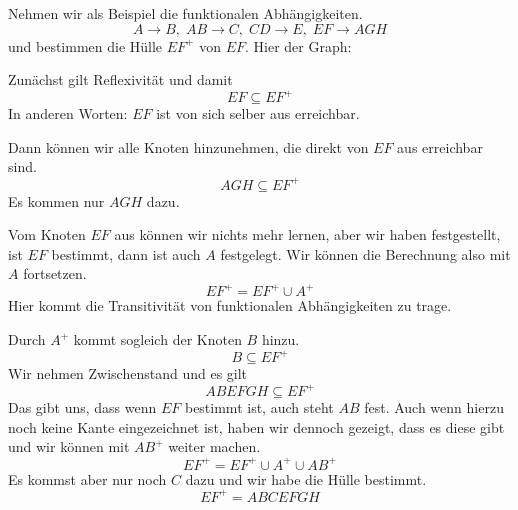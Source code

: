 \documentclass[a4paper, ngerman]{article}
\begin{document}
Nehmen wir als Beispiel
die funktionalen Abhängigkeiten.
$$
    A  \to B,\;
    AB \to C,\;
    CD \to E,\;
    EF \to AGH
$$
und bestimmen die Hülle $EF^+$ von $EF$.
Hier der Graph:
\begin{center}
\end{center}
Zunächst gilt Reflexivität und damit
$$
    EF \subseteq EF^+
$$
In anderen Worten: $EF$ ist von sich selber aus erreichbar.

Dann können wir alle Knoten hinzunehmen,
die direkt von $EF$ aus erreichbar sind.
$$
    AGH \subseteq EF^+  
$$
Es kommen nur $AGH$ dazu.

Vom Knoten $EF$ aus können wir nichts mehr lernen,
aber wir haben festgestellt, ist $EF$ bestimmt,
dann ist auch $A$ festgelegt.
Wir können die Berechnung also mit $A$ fortsetzen.
$$
    EF^+ = EF^+ \cup A^+
$$
Hier kommt die Transitivität
von funktionalen Abhängigkeiten zu trage.

Durch $A^+$ kommt sogleich der Knoten $B$ hinzu.
$$
    B \subseteq EF^+
$$
Wir nehmen Zwischenstand und es gilt
$$
    ABEFGH \subseteq EF^+
$$
Das gibt uns, dass wenn $EF$ bestimmt ist,
auch steht $AB$ fest.
Auch wenn hierzu noch keine Kante eingezeichnet ist,
haben wir dennoch gezeigt, dass es diese gibt
und wir können mit $AB^+$ weiter machen.
$$
    EF^+ = EF^+ \cup A^+ \cup AB^+
$$
Es kommst aber nur noch $C$ dazu
und wir habe die Hülle bestimmt.
$$
    EF^+ = ABCEFGH
$$
\end{document}
